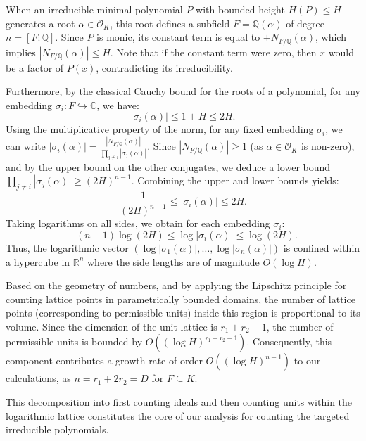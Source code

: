 \documentclass[11pt,a4paper]{article}
\newcommand{\R}{\mathbb{R}}
\newcommand{\Q}{\mathbb{Q}}
\newcommand{\C}{\mathbb{C}}
\newcommand{\OK}{\mathcal{O}_K}
\begin{document}
When an irreducible minimal polynomial $P$ with bounded height $H(P) \le H$ generates a root $\alpha \in \OK$, this root defines a subfield $F = \Q(\alpha)$ of degree $n = [F:\Q]$. Since $P$ is monic, its constant term is equal to $\pm N_{F/\Q}(\alpha)$, which implies $|N_{F/\Q}(\alpha)| \le H$. Note that if the constant term were zero, then $x$ would be a factor of $P(x)$, contradicting its irreducibility.

Furthermore, by the classical Cauchy bound for the roots of a polynomial, for any embedding $\sigma_i : F \hookrightarrow \C$, we have:
\begin{equation*}
    |\sigma_i(\alpha)| \le 1 + H \le 2H.
\end{equation*}
Using the multiplicative property of the norm, for any fixed embedding $\sigma_i$, we can write $|\sigma_i(\alpha)| = \frac{|N_{F/\Q}(\alpha)|}{\prod_{j \neq i} |\sigma_j(\alpha)|}$. Since $|N_{F/\Q}(\alpha)| \ge 1$ (as $\alpha \in \OK$ is non-zero), and by the upper bound on the other conjugates, we deduce a lower bound $\prod_{j \neq i} |\sigma_j(\alpha)| \ge (2H)^{n-1}$. Combining the upper and lower bounds yields:
\begin{equation*}
    \frac{1}{(2H)^{n-1}} \le |\sigma_i(\alpha)| \le 2H.
\end{equation*}
Taking logarithms on all sides, we obtain for each embedding $\sigma_i$:
\begin{equation*}
    -(n-1)\log(2H) \le \log|\sigma_i(\alpha)| \le \log(2H).
\end{equation*}
Thus, the logarithmic vector $(\log|\sigma_1(\alpha)|, \dots, \log|\sigma_n(\alpha)|)$ is confined within a hypercube in $\R^n$ where the side lengths are of magnitude $O(\log H)$.

Based on the geometry of numbers, and by applying the Lipschitz principle for counting lattice points in parametrically bounded domains, the number of lattice points (corresponding to permissible units) inside this region is proportional to its volume. Since the dimension of the unit lattice is $r_1 + r_2 - 1$, the number of permissible units is bounded by $O((\log H)^{r_1+r_2-1})$. Consequently, this component contributes a growth rate of order $O((\log H)^{n-1})$ to our calculations, as $n = r_1 + 2r_2 = D$ for $F \subseteq K$. 

This decomposition into first counting ideals and then counting units within the logarithmic lattice constitutes the core of our analysis for counting the targeted irreducible polynomials.
\end{document}
